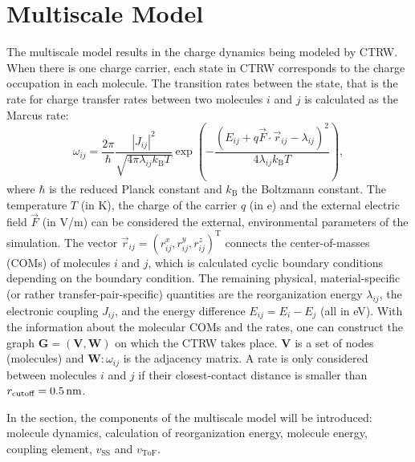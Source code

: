 \documentclass[letterpaper,12pt]{article}
\begin{document}
\section{Multiscale Model}
The multiscale model results in the charge dynamics being modeled by CTRW. When there is one charge carrier, each state in CTRW corresponds to the charge occupation in each molecule. The transition rates between the state, that is the rate for charge transfer rates between two molecules $i$ and $j$ is calculated as the Marcus rate:
%
\begin{equation}
    \omega_{ij} = \frac{2\pi}{\hbar} \frac{|J_{ij}|^2}{\sqrt{4\pi \lambda_{ij} k_\text{B}T}} \exp\left(-\frac{(E_{ij} + q \vec{F} \cdot \vec{r}_{ij} - \lambda_{ij})^2}{4\lambda_{ij} k_\text{B}T}\right) ,
    \label{equ:Marcus}
\end{equation}
%
where $\hbar$ is the reduced Planck constant and $k_\text{B}$ the Boltzmann constant. The temperature $T$ (in \unit[]{K}), the charge of the carrier $q$ (in \unit[]{e}) and the external electric field $\vec{F}$ (in V/m) can be considered the external, environmental parameters of the simulation. The vector $\vec{r}_{ij} = (r^x_{ij},r^y_{ij},r^z_{ij})^\text{T}$ connects the center-of-masses (COMs) of molecules $i$ and $j$, which is calculated cyclic boundary conditions depending on the boundary condition. The remaining physical, material-specific (or rather transfer-pair-specific) quantities are the reorganization energy $\lambda_{ij}$, the electronic coupling $J_{ij}$, and the energy difference $E_{ij} = E_i - E_j$ (all in \unit[]{eV}). With the information about the molecular COMs and the rates, one can construct the graph $\mathbf{G}=(\mathbf{V}, \mathbf{W})$ on which the CTRW takes place. $\mathbf{V}$ is a set of nodes (molecules) and $\mathbf{W}: \omega_{ij}$ is the adjacency matrix. A rate is only considered between molecules $i$ and $j$ if their closest-contact distance is smaller than $r_\text{cutoff}=\unit[0.5]{nm}$.

In the section, the components of the multiscale model will be introduced: molecule dynamics, calculation of reorganization energy, molecule energy, coupling element, $v_\text{SS}$ and $v_\text{ToF}$.

\end{document}
